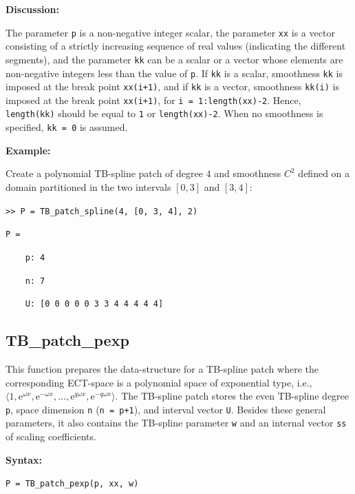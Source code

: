 \documentclass[10pt]{acmtrans2e}
\newcommand{\syntax}[1]{\medskip
\noindent \textbf{Syntax:} \medskip

\texttt{#1}
}
\newenvironment{remark}
{\vspace*{0.1cm}
\noindent \textbf{Discussion:} \medskip

}
{
\vspace*{0.2cm}
}
\newenvironment{example}
{\vspace*{0.1cm}
\noindent \textbf{Example:} \vspace*{0.15cm}

\setlength{\parskip}{0.5ex plus 0.5exminus 0.2 ex}
}
{\medskip
}
\begin{document}
\begin{remark}
\noindent The parameter \texttt{p} is a non-negative integer scalar, the parameter \texttt{xx} is a vector consisting of a strictly increasing sequence of real values (indicating the different segments), and the parameter \texttt{kk} can be a scalar or a vector whose elements are non-negative integers less than the value of \texttt{p}. If \texttt{kk} is a scalar, smoothness \texttt{kk} is imposed at the break point \texttt{xx(i+1)}, and if \texttt{kk} is a vector, smoothness \texttt{kk(i)} is imposed at the break point \texttt{xx(i+1)}, for \texttt{i = 1:length(xx)-2}. Hence, \texttt{length(kk)} should be equal to \texttt{1} or \texttt{length(xx)-2}. When no smoothness is specified, \texttt{kk = 0} is assumed.
\end{remark}

\begin{example}
\noindent Create a polynomial TB-spline patch of degree $4$ and smoothness $C^2$ defined on a domain partitioned in the two intervals $[0, 3]$ and $[3, 4]$: 
\medskip

\texttt{>> P = TB\_patch\_spline(4, [0, 3, 4], 2)}

\texttt{P = }

\texttt{\ \ \ \ p:\ 4}

\texttt{\ \ \ \ n:\ 7}

\texttt{\ \ \ \ U:\ [0 0 0 0 0 3 3 4 4 4 4 4]}
\end{example}


\subsection{TB\_patch\_pexp} \label{sec:matlab-tb-patch-pexp}

This function prepares the data-structure for a TB-spline patch where the corresponding ECT-space is a polynomial space of exponential type, i.e., $\langle 1, \mathrm{e}^{\omega x}, \mathrm{e}^{-\omega x}, \ldots, \mathrm{e}^{q\omega x}, \mathrm{e}^{-q\omega x}\rangle$. The TB-spline patch stores the even TB-spline degree \texttt{p}, space dimension \texttt{n} (\texttt{n = p+1}), and interval vector \texttt{U}. Besides these general parameters, it also contains the TB-spline parameter \texttt{w} and an internal vector \texttt{ss} of scaling coefficients.

\syntax{P = TB\_patch\_pexp(p, xx, w)}
\end{document}
